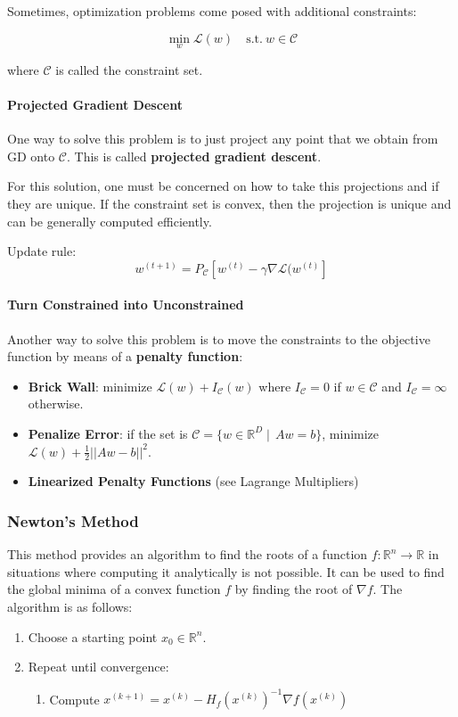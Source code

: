 \documentclass{article}
\newcommand{\R}{\mathbb{R}}
\newcommand{\loss}{\mathcal{L}}
\begin{document}
Sometimes, optimization problems come posed with additional constraints:

$$
\min_{w} \loss(w) \quad \text{s.t.} \ w \in \mathcal{C}
$$

where $\mathcal{C}$ is called the constraint set.

\paragraph{Projected Gradient Descent}

One way to solve this problem is to just project any point that we obtain from GD onto $\mathcal{C}$.
This is called \textbf{projected gradient descent}.

For this solution, one must be concerned on how to take this projections and if they are unique.
If the constraint set is convex, then the projection is unique and can be generally computed efficiently.

Update rule:
$$
w^{(t+1)} = P_\mathcal{C} \left[ w^{(t)} - \gamma \nabla \loss(w^{(t)} \right]
$$

\paragraph{Turn Constrained into Unconstrained}

Another way to solve this problem is to move the constraints to the objective function by means of a \textbf{penalty function}:

\begin{itemize}
\item \textbf{Brick Wall}: minimize $\loss(w) + I_\mathcal{C}(w)$ where $I_\mathcal{C} = 0$ if $w \in \mathcal{C}$ and $I_\mathcal{C} = \infty$ otherwise.
    \item \textbf{Penalize Error}: if the set is $\mathcal{C} = \{ w \in \R^D \mid \, Aw = b \}$, minimize $\loss(w) + \frac{1}{2} ||Aw - b||^2$.
    \item \textbf{Linearized Penalty Functions} (see Lagrange Multipliers)
\end{itemize}

\subsubsection{Newton's Method} 

This method provides an algorithm to find the roots of a function $f: \R^n \to \R$ in situations where computing it analytically is not possible.
It can be used to find the global minima of a convex function $f$ by finding the root of $\nabla f$.
The algorithm is as follows:
\begin{enumerate}
    \item Choose a starting point $x_0 \in \R^n$.
    \item Repeat until convergence:
    \begin{enumerate}
	\item Compute $x^{(k+1)} = x^{(k)} - H_f(x^{(k)})^{-1} \nabla f(x^{(k)})$
    \end{enumerate}
\end{enumerate}
\end{document}

